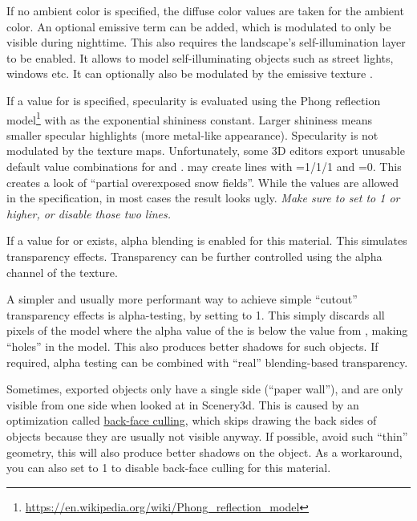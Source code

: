 If no ambient color is specified, the diffuse color values are taken for the
ambient color. An optional emissive term  can be added, which is
modulated to only be visible during nighttime. This also requires the
landscape's self-illumination layer to be enabled. It allows to model
self-illuminating objects such as street lights, windows etc. It can optionally
also be modulated by the emissive texture .

If a value for  is specified, specularity is evaluated
using the Phong reflection
model\footnote{\url{https://en.wikipedia.org/wiki/Phong_reflection_model}}
with  as the exponential shininess constant. Larger
shininess means smaller specular highlights (more metal-like
appearance). Specularity is not modulated by the texture
maps. Unfortunately, some 3D editors export unusable default value
combinations for  and . 
may create lines with =1/1/1 and =0. This
creates a look of ``partial overexposed snow fields''. While the
values are allowed in the specification, in most cases the result
looks ugly. \emph{Make sure to set  to 1 or higher, or
  disable those two lines.}

If a value for  or  exists, alpha blending is enabled for this
material. This simulates transparency effects. Transparency can be further
controlled using the alpha channel of the  texture.

A simpler and usually more performant way to achieve simple ``cutout''
transparency effects is alpha-testing, by setting  to 1. This
simply discards all pixels of the model where the alpha value of the
 is below the  value from
, making ``holes'' in the model. This also produces
better shadows for such objects. If required, alpha testing can be combined with
``real'' blending-based transparency.

Sometimes, exported objects only have a single side (``paper wall''), and are only visible
from one side when looked at in Scenery3d. This is caused by an optimization
called \href{https://en.wikipedia.org/wiki/Back-face_culling}{back-face
culling}, which skips drawing the back sides of objects because they are usually
not visible anyway. If possible, avoid such ``thin'' geometry, this will also
produce better shadows on the object. As a workaround, you can also set
 to 1 to disable back-face culling for this material.

